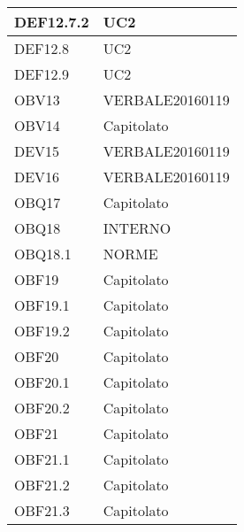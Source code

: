 \documentclass{scalatekids-article}
\begin{document}
\begin{longtable}[H]{|p{5.5cm}|p{5.5cm}|}
  \hline
  DEF12.7.2 & \multiLineCell[t]{UC2\\}\\
  \hline
  DEF12.8 & \multiLineCell[t]{UC2\\}\\
  \hline
  DEF12.9 & \multiLineCell[t]{UC2\\}\\
  \hline
  OBV13 & \multiLineCell[t]{VERBALE20160119\\}\\
  \hline
  OBV14 & \multiLineCell[t]{Capitolato\\}\\
  \hline
  DEV15 & \multiLineCell[t]{VERBALE20160119\\}\\
  \hline
  DEV16 & \multiLineCell[t]{VERBALE20160119\\}\\
  \hline
  OBQ17 & \multiLineCell[t]{Capitolato\\}\\
  \hline
  OBQ18 & \multiLineCell[t]{INTERNO\\}\\
  \hline
  OBQ18.1 & \multiLineCell[t]{NORME\\}\\
  \hline
  OBF19 & \multiLineCell[t]{Capitolato\\}\\
  \hline
  OBF19.1 & \multiLineCell[t]{Capitolato\\}\\
  \hline
  OBF19.2 & \multiLineCell[t]{Capitolato\\}\\
  \hline
  OBF20 & \multiLineCell[t]{Capitolato\\}\\
  \hline
  OBF20.1 & \multiLineCell[t]{Capitolato\\}\\
  \hline
  OBF20.2 & \multiLineCell[t]{Capitolato\\}\\
  \hline
  OBF21 & \multiLineCell[t]{Capitolato\\}\\
  \hline
  OBF21.1 & \multiLineCell[t]{Capitolato\\}\\
  \hline
  OBF21.2 & \multiLineCell[t]{Capitolato\\}\\
  \hline
  OBF21.3 & \multiLineCell[t]{Capitolato\\}\\

\end{longtable}
\end{document}
